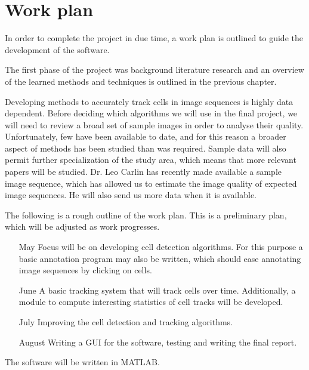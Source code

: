 \documentclass[12pt,a4paper,openany]{book}
\begin{document}
\chapter{Work plan}
\label{chap:workplan}

In order to complete the project in due time, a work plan is outlined to guide the development of the software.

The first phase of the project was background literature research and an overview of the learned methods and techniques is outlined in the previous chapter.

Developing methods to accurately track cells in image sequences is highly data dependent. Before deciding which algorithms we will use in the final project, we will need to review a broad set of sample images in order to analyse their quality. Unfortunately, few have been available to date, and for this reason a broader aspect of methods has been studied than was required. Sample data will also permit further specialization of the study area, which means that more relevant papers will be studied. Dr. Leo Carlin has recently made available a sample image sequence, which has allowed us to estimate the image quality of expected image sequences. He will also send us more data when it is available.

The following is a rough outline of the work plan. This is a preliminary plan, which will be adjusted as work progresses.

\begin{enumerate}
  \item [May] Focus will be on developing cell detection algorithms. For this purpose a basic annotation program may also be written, which should ease annotating image sequences by clicking on cells.
  \item [June] A basic tracking system that will track cells over time. Additionally, a module to compute interesting statistics of cell tracks will be developed.
  \item[July] Improving the cell detection and tracking algorithms. 
  \item [August] Writing a GUI for the software, testing and writing the final report.
\end{enumerate}

The software will be written in MATLAB.



\newpage


\label{page_bibliography}
 
\end{document}
